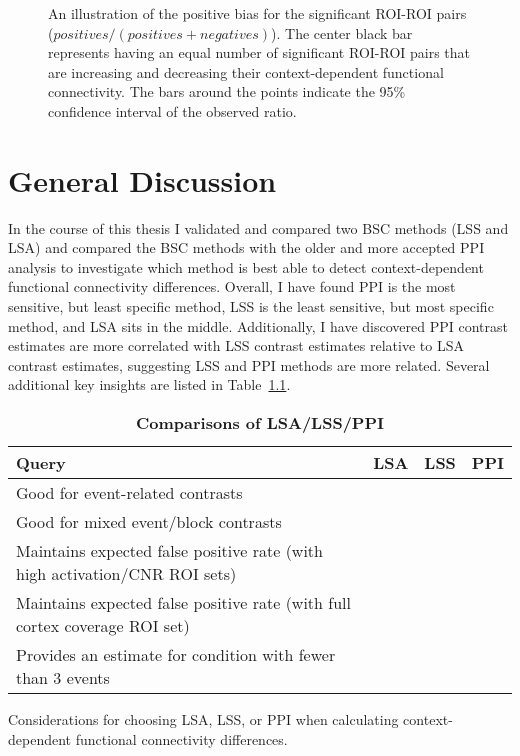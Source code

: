 \documentclass[phd,figures,tables,ackpage,abstractpage,publicabstractpage]{uithesis}
\newcommand{\cmark}{\ding{51}}%
\newcommand{\xmark}{\ding{55}}%
\begin{document}
\begin{figure}[H]
  \centering
  \hfill

  \caption[Positive bias of LSA/LSS/PPI in Schaefer Atlas]{
    An illustration of the positive bias for the significant ROI-ROI pairs
    ($positives / (positives + negatives)$).
    The center black bar represents having an equal number of significant
    ROI-ROI pairs that are increasing and decreasing their context-dependent
    functional connectivity.
    The bars around the points indicate the 95\% confidence interval
    of the observed ratio.
  }
  \label{fig:positive_bias_schaefer}
\end{figure}

\chapter{General Discussion}

In the course of this thesis I validated and compared two BSC methods (LSS and LSA) and compared
the BSC methods with the older and more accepted PPI analysis to investigate
which method is best able to detect context-dependent functional
connectivity differences.
Overall, I have found PPI is the most sensitive, but least specific method, LSS
is the least sensitive, but most specific method, and LSA sits in the middle.
Additionally, I have discovered PPI contrast estimates are more correlated
with LSS contrast estimates relative to LSA contrast estimates, suggesting
LSS and PPI methods are more related.
Several additional key insights are listed in Table~\ref{table:comparison}.

\begin{table}[H]
  \centering
  \caption{
  {\bf Comparisons of LSA/LSS/PPI}}
  \begin{tabular}{|p{}|c|c|c|}
  \hline
  \textbf{Query} & \textbf{LSA} & \textbf{LSS} & \textbf{PPI}\\ \hline
  Good for event-related contrasts & \xmark & \xmark & \cmark\\ \hline
  Good for mixed event/block contrasts & \cmark & \cmark & \cmark\\ \hline
  Maintains expected false positive rate (with high activation/CNR ROI sets) & \xmark & \cmark & \xmark\\ \hline
  Maintains expected false positive rate (with full cortex coverage ROI set) & \xmark & \xmark & \xmark\\ \hline
  Provides an estimate for condition with fewer than 3 events & \xmark & \xmark & \cmark\\ \hline
  \end{tabular}

  Considerations for choosing LSA, LSS, or PPI when calculating context-dependent
  functional connectivity differences.
  \label{table:comparison}
\end{table}
\end{document}
